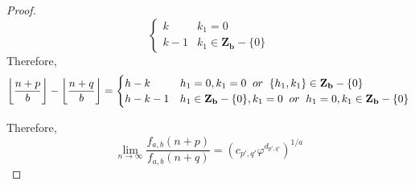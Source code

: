 \documentclass[preprint,12pt]{elsarticle}
\begin{document}
\begin{proof}
\begin{equation*}
\begin{cases}
	k & k_1 = 0\\
	k - 1 & k_1 \in \mathbf{Z_b} - \{0\}
	\end{cases}
	\end{equation*}
	Therefore,\\
	\begin{equation*}
	\left\lfloor\dfrac{n + p}{b}\right\rfloor -\left\lfloor\dfrac{n + q}{b}\right\rfloor  = \begin{cases}
	h - k & h_1 = 0, k_1 = 0 \hspace{2mm}or\hspace{2mm}\{h_1, k_1\} \in \mathbf{Z_b} - \{0\}\\
	h - k - 1 & h_1 \in \mathbf{Z_b} - \{0\}, k_1 = 0\hspace{2mm}or\hspace{2mm} h_1= 0, k_1 \in \mathbf{Z_b} - \{0\}
	\end{cases}
	\end{equation*}
	
	Therefore,\\
	$$\lim_{n \to \infty} \dfrac{f_{a,b}(n + p)}{f_{a,b}(n + q)} = \left(c_{p',q'}\varphi^{d_{p',q'}}\right)^{1/a}$$
\end{proof}
\end{document}
